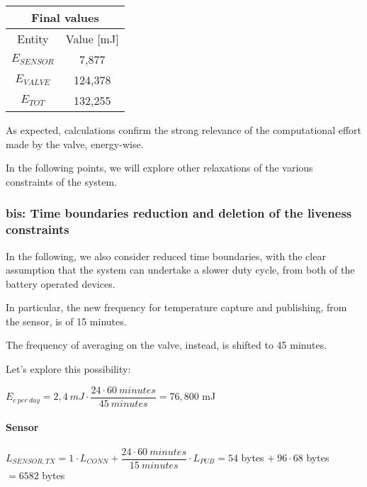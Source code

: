 \documentclass[a4paper,11pt]{article} %
\begin{document}
    \begin{center}
        \begin{tabular}{|c|c|}
            \hline
            \multicolumn{2}{|c|}{Final values} \\
            \hline
            Entity       & Value [mJ] \\
            \hline
            $E_{SENSOR}$ & 7,877      \\
            \hline
            $E_{VALVE}$  & 124,378    \\
            \hline
            $E_{TOT}$    & 132,255    \\
            \hline
        \end{tabular}
    \end{center}

    As expected, calculations confirm the strong relevance of the computational effort made by the valve, energy-wise.

    In the following points, we will explore other relaxations of the various constraints of the system.

    \subsubsection{bis: Time boundaries reduction and deletion of the liveness constraints}

    In the following, we also consider reduced time boundaries, with the clear assumption that the system can undertake a slower duty cycle, from both of the battery operated devices.

    In particular, the new frequency for temperature capture and publishing, from the sensor, is of 15 minutes.

    The frequency of averaging on the valve, instead, is shifted to 45 minutes.

    \smallskip

    Let's explore this possibility:

    \medskip

    $E_{c \ per \ day} = 2,4\ mJ \cdot \dfrac{24 \cdot 60\ minutes}{45\ minutes} = 76,800$ mJ

    \medskip

    \paragraph{Sensor}

    $L_{SENSOR, TX} = 1 \cdot L_{CONN} + \dfrac{24 \cdot 60\ minutes}{15\ minutes} \cdot L_{PUB} = 54$ bytes $+\ 96 \cdot 68$ bytes $ = 6582$ bytes
\end{document}
